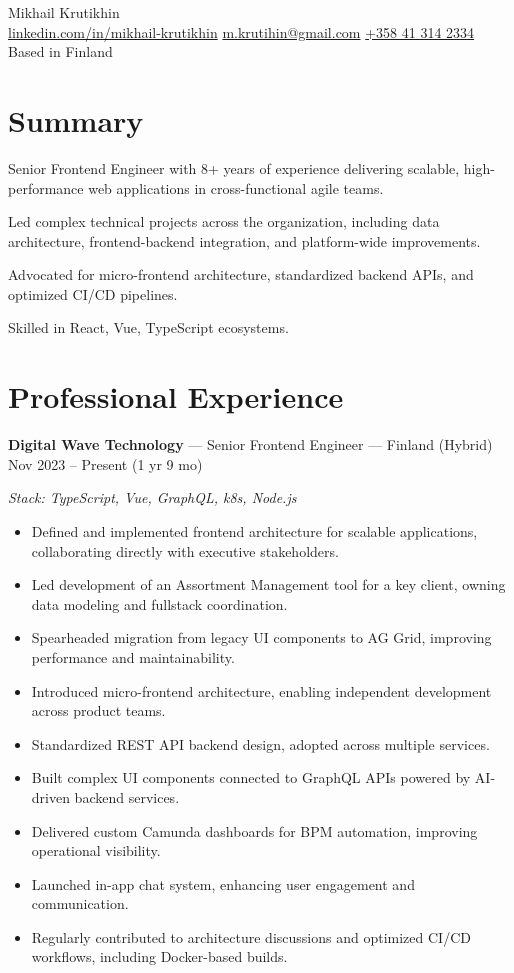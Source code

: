 \documentclass[a4paper,9pt]{article}
\begin{document}
\pagestyle{empty}

\begin{center}
    {\Huge Mikhail Krutikhin}\\
    \href{https://linkedin.com/in/mikhail-krutikhin}{linkedin.com/in/mikhail-krutikhin} \quad
    \href{mailto:m.krutihin@gmail.com}{m.krutihin@gmail.com} \quad
    \href{tel:+358413142334}{+358 41 314 2334} \quad
    Based in Finland
\end{center}

\section{Summary}
Senior Frontend Engineer with 8+ years of experience delivering scalable, high-performance web applications in cross-functional agile teams.

Led complex technical projects across the organization, including data architecture, frontend-backend integration, and platform-wide improvements. 

Advocated for micro-frontend architecture, standardized backend APIs, and optimized CI/CD pipelines. 

Skilled in React, Vue, TypeScript ecosystems.

\section{Professional Experience}

\textbf{Digital Wave Technology} --- Senior Frontend Engineer --- Finland (Hybrid) \hfill Nov 2023 -- Present (1 yr 9 mo)

\textit{Stack: TypeScript, Vue, GraphQL, k8s, Node.js}
\begin{itemize}[leftmargin=*]
  \item Defined and implemented frontend architecture for scalable applications, collaborating directly with executive stakeholders.
  \item Led development of an Assortment Management tool for a key client, owning data modeling and fullstack coordination.
  \item Spearheaded migration from legacy UI components to AG Grid, improving performance and maintainability.
  \item Introduced micro-frontend architecture, enabling independent development across product teams.
  \item Standardized REST API backend design, adopted across multiple services.
  \item Built complex UI components connected to GraphQL APIs powered by AI-driven backend services.
  \item Delivered custom Camunda dashboards for BPM automation, improving operational visibility.
  \item Launched in-app chat system, enhancing user engagement and communication.
  \item Regularly contributed to architecture discussions and optimized CI/CD workflows, including Docker-based builds.
\end{itemize}
\vspace{6pt}
\end{document}
